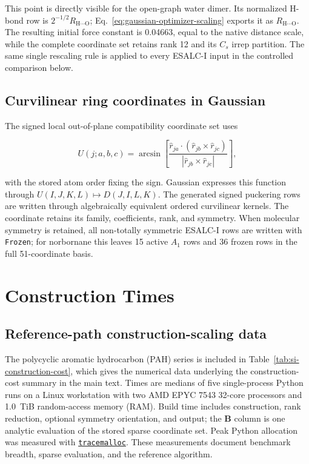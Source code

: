 \documentclass[10pt]{article}
\newcommand{\Bmat}{\mathbf{B}}
\begin{document}
This point is directly visible for the open-graph water dimer.  Its normalized
H-bond row is \(2^{-1/2}R_{\mathrm{H\cdots O}}\); Eq.~\ref{eq:gaussian-optimizer-scaling}
exports it as \(R_{\mathrm{H\cdots O}}\).  The resulting initial force constant
is 0.04663, equal to the native distance scale, while the complete {coordinate set}
retains rank 12 and its \(C_s\) irrep partition.  The same single rescaling rule
is applied to every ESALC-I input in the controlled comparison below.

\subsection{Curvilinear ring coordinates in Gaussian}

The signed local out-of-plane compatibility {coordinate set} uses

\[
U(j;a,b,c)=\arcsin\!\left[
\frac{\hat r_{ja}\cdot(\hat r_{jb}\times\hat r_{jc})}
{|\hat r_{jb}\times\hat r_{jc}|}\right],
\]

with the stored atom order fixing the sign. Gaussian expresses this
function through
\(U(I,J,K,L)\mapsto D(J,I,L,K)\).  The generated signed puckering rows are
written through algebraically equivalent ordered curvilinear kernels.  The coordinate retains its family, coefficients, rank, and symmetry.  When molecular symmetry is retained, all non-totally
symmetric ESALC-I rows are written with \texttt{Frozen}; for norbornane this
leaves 15 active \(A_1\) rows and 36 frozen rows in the full 51-coordinate
basis.

\section{Construction Times}

\subsection{Reference-path construction-scaling data}

{The polycyclic aromatic hydrocarbon (PAH) series is included in}
Table~\ref{tab:si-construction-cost}, {which gives} the numerical data underlying the
construction-cost summary in the main text.  Times are medians of five single-process Python
runs on a Linux workstation with two AMD EPYC 7543 32-core processors and
1.0~TiB {random-access memory (RAM)}.  Build time includes construction, rank reduction, optional
symmetry orientation, and output; the \(\Bmat\) column is one analytic
evaluation of the stored sparse coordinate set.  Peak Python allocation was measured
with \href{https://docs.python.org/3/library/tracemalloc.html}{\texttt{tracemalloc}}.  These measurements document
{benchmark breadth}, sparse evaluation, and the reference algorithm.
\end{document}
